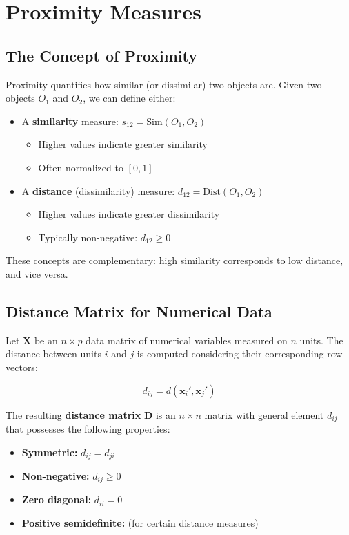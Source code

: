 \documentclass[11pt]{article}
\begin{document}
\section{Proximity Measures}

\subsection{The Concept of Proximity}

Proximity quantifies how similar (or dissimilar) two objects are. Given two objects $O_1$ and $O_2$, we can define either:

\begin{itemize}
    \item A \textbf{similarity} measure: $s_{12} = \text{Sim}(O_1, O_2)$
    \begin{itemize}
        \item Higher values indicate greater similarity
        \item Often normalized to $[0, 1]$
    \end{itemize}
    \item A \textbf{distance} (dissimilarity) measure: $d_{12} = \text{Dist}(O_1, O_2)$
    \begin{itemize}
        \item Higher values indicate greater dissimilarity
        \item Typically non-negative: $d_{12} \geq 0$
    \end{itemize}
\end{itemize}

These concepts are complementary: high similarity corresponds to low distance, and vice versa.

\subsection{Distance Matrix for Numerical Data}

Let $\mathbf{X}$ be an $n \times p$ data matrix of numerical variables measured on $n$ units. The distance between units $i$ and $j$ is computed considering their corresponding row vectors:

$$d_{ij} = d(\mathbf{x}_i', \mathbf{x}_j')$$

The resulting \textbf{distance matrix} $\mathbf{D}$ is an $n \times n$ matrix with general element $d_{ij}$ that possesses the following properties:

\begin{itemize}
    \item \textbf{Symmetric:} $d_{ij} = d_{ji}$
    \item \textbf{Non-negative:} $d_{ij} \geq 0$
    \item \textbf{Zero diagonal:} $d_{ii} = 0$
    \item \textbf{Positive semidefinite:} (for certain distance measures)
\end{itemize}
\end{document}

